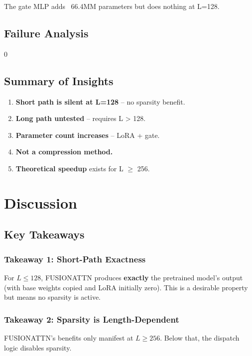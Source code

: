 The gate MLP adds ~66.4MM parameters but does nothing at L=128.

\subsection{Failure Analysis}

0

\subsection{Summary of Insights}

\begin{enumerate}
\item \textbf{Short path is silent at L=128} -- no sparsity benefit.
\item \textbf{Long path untested} -- requires L > 128.
\item \textbf{Parameter count increases} -- LoRA + gate.
\item \textbf{Not a compression method.}
\item \textbf{Theoretical speedup} exists for L $\ge$ 256.

\end{enumerate}


\section{Discussion}

\subsection{Key Takeaways}

\subsubsection{Takeaway 1: Short-Path Exactness}

For $L \leq 128$, FUSIONATTN produces \textbf{exactly} the pretrained model's 
output (with base weights copied and LoRA initially zero). This is a 
desirable property but means no sparsity is active.

\subsubsection{Takeaway 2: Sparsity is Length-Dependent}

FUSIONATTN's benefits only manifest at $L \geq 256$. Below that, the 
dispatch logic disables sparsity.

